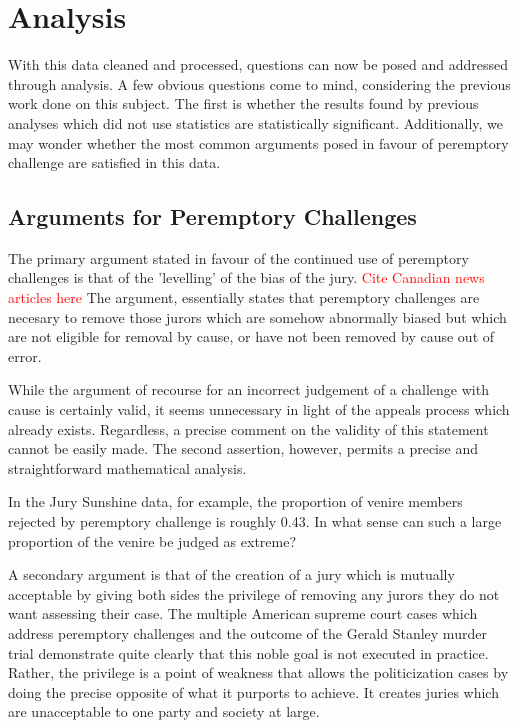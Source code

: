 \chapter{Analysis} \label{c:analysis}

With this data cleaned and processed, questions can now be posed and addressed through analysis. A few obvious questions come to
mind, considering the previous work done on this subject. The first is whether the results found by previous analyses which did
not use statistics are statistically significant. Additionally, we may wonder whether the most common arguments posed in favour of
peremptory challenge are satisfied in this data.

\section{Arguments for Peremptory Challenges} \label{sec:leveling}

The primary argument stated in favour of the continued use of peremptory challenges is that of the 'levelling' of the bias of the
jury. \textcolor{red}{Cite Canadian news articles here} The argument, essentially states that peremptory challenges are necesary
to remove those jurors which are somehow abnormally biased but which are not eligible for removal by cause, or have not been
removed by cause out of error.

While the argument of recourse for an incorrect judgement of a challenge with cause is certainly valid, it seems unnecessary in
light of the appeals process which already exists. Regardless, a precise comment on the validity of this statement cannot be
easily made. The second assertion, however, permits a precise and straightforward mathematical analysis.

In the Jury Sunshine data, for example, the proportion of venire members rejected by peremptory challenge is roughly 0.43. In what
sense can such a large proportion of the venire be judged as extreme?

A secondary argument is that of the creation of a jury which is mutually acceptable by giving both sides the privilege of removing
any jurors they do not want assessing their case. The multiple American supreme court cases which address peremptory challenges
and the outcome of the Gerald Stanley murder trial demonstrate quite clearly that this noble goal is not executed in
practice. Rather, the privilege is a point of weakness that allows the politicization cases by doing the precise opposite of what
it purports to achieve. It creates juries which are unacceptable to one party and society at large.

